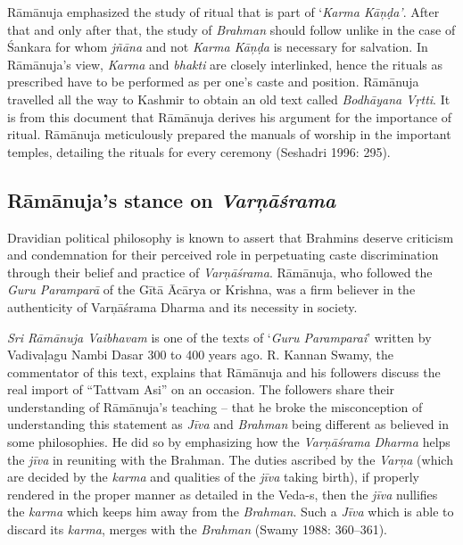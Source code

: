 \newpage

Rāmānuja emphasized the study of ritual that is part of ‘\textit{Karma Kāņḍa’}. After that and only after that, the study of \textit{Brahman} should follow unlike in the case of Śankara for whom \textit{jñāna }and not \textit{Karma Kāņḍa} is necessary for salvation. In Rāmānuja’s view, \textit{Karma} and \textit{bhakti} are closely interlinked, hence the rituals as prescribed have to be performed as per one’s caste and position. Rāmānuja travelled all the way to Kashmir to obtain an old text called \textit{Bodhāyana Vṛtti}. It is from this document that Rāmānuja derives his argument for the importance of ritual. Rāmānuja meticulously prepared the manuals of worship in the important temples, detailing the rituals for every ceremony (Seshadri 1996: 295).


\subsection*{Rāmānuja’s stance on \textit{Varņāśrama}}

Dravidian political philosophy is known to assert that Brahmins deserve criticism and condemnation for their perceived role in perpetuating caste discrimination through their belief and practice of \textit{Varņāśrama}. Rāmānuja, who followed the \textit{Guru Paramparā} of the Gītā Ācārya or Krishna, was a firm believer in the authenticity of Varņāśrama Dharma and its necessity in society.

\textit{Sri Rāmānuja Vaibhavam} is one of the texts of ‘\textit{Guru Paramparai}’ written by Vadivaḷagu Nambi Dasar 300 to 400 years ago. R. Kannan Swamy, the commentator of this text, explains that Rāmānuja and his followers discuss the real import of “Tattvam Asi” on an occasion. The followers share their understanding of Rāmānuja’s teaching – that he broke the misconception of understanding this statement as \textit{Jīva} and \textit{Brahman} being different as believed in some philosophies. He did so by emphasizing how the \textit{Varņāśrama Dharma} helps the \textit{jīva }in reuniting with the Brahman. The duties ascribed by the \textit{Varņa} (which are decided by the \textit{karma }and qualities of the \textit{jīva} taking birth), if properly rendered in the proper manner as detailed in the Veda-s, then the \textit{jīva} nullifies the \textit{karma} which keeps him away from the \textit{Brahman}. Such a \textit{Jīva} which is able to discard its \textit{karma}, merges with the \textit{Brahman} (Swamy 1988: 360–361).

